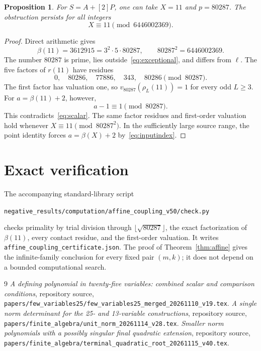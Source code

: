 \documentclass[11pt,a4paper]{article}
\newtheorem{proposition}[theorem]{Proposition}
\begin{document}
\begin{proposition}\label{prop:explicit}
For $S=A+[2]P$, one can take $X=11$ and $p=80287$.
The obstruction persists for all integers
\[
                              X\equiv11\pmod{6446002369}.
\]
\end{proposition}
\begin{proof}
Direct arithmetic gives
\[
 \beta(11)=3612915=3^2\cdot5\cdot80287,\qquad
                         80287^2=6446002369.
\]
The number $80287$ is prime, lies outside~\eqref{eq:exceptional},
and differs from $\ell$. The five factors of $r(11)$ have residues
\[
                    0,\quad80286,\quad77886,\quad343,\quad80286
                    \pmod{80287}.
\]
The first factor has valuation one, so
$v_{80287}(\rho_L(11))=1$ for every odd $L\ge3$.
For $a=\beta(11)+2$, however,
\[
                            a-1\equiv1\pmod{80287}.
\]
This contradicts~\eqref{eq:scalar}. The same factor residues and
first-order valuation hold whenever $X\equiv11\pmod{80287^2}$.
In the sufficiently large source range, the point identity forces
$a=\beta(X)+2$ by~\eqref{eq:inputindex}.
\end{proof}

\section*{Exact verification}
The accompanying standard-library script
\begin{center}\small
\texttt{negative\_results/computation/affine\_coupling\_v50/check.py}
\end{center}
checks primality by trial
division through $\lfloor\sqrt{80287}\rfloor$, the exact
factorization of $\beta(11)$, every contact residue, and the first-order
valuation. It writes \nolinkurl{affine_coupling_certificate.json}.
The proof of Theorem~\ref{thm:affine} gives the infinite-family
conclusion for every fixed pair $(m,k)$; it does not depend on a
bounded computational search.

\begin{thebibliography}{9}
\emph{A defining polynomial in twenty-five variables: combined scalar
and comparison conditions}, repository source,
\nolinkurl{papers/few_variables25/few_variables25_merged_20261110_v19.tex}.
\emph{A single norm determinant for the 25- and 13-variable constructions},
repository source,
\nolinkurl{papers/finite_algebra/unit_norm_20261114_v28.tex}.
\emph{Smaller norm polynomials with a possibly singular final quadratic
extension}, repository source,
\nolinkurl{papers/finite_algebra/terminal_quadratic_root_20261115_v40.tex}.
\end{thebibliography}
\end{document}
